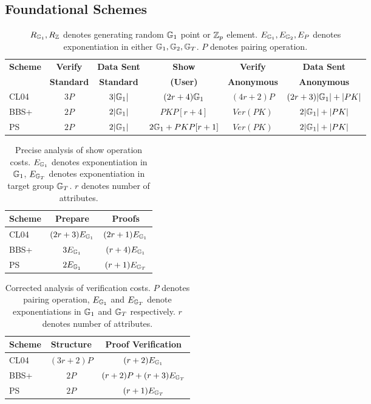 {\subsection{Foundational Schemes}
\begin{table}[ht]
\centering
\label{tab:original-schemes}
\begin{tabular}{l|ccccc}
\toprule
\textbf{Scheme} & \textbf{Verify} & \textbf{Data Sent} & \textbf{Show} & \textbf{Verify} & \textbf{Data Sent} \\
& \textbf{Standard} & \textbf{Standard} & \textbf{(User)} & \textbf{Anonymous} & \textbf{Anonymous} \\
\midrule
CL04 & $3P$ & $3|\mathbb{G}_1|$ & $(2r+4)\mathbb{G}_1$ & $(4r+2)P$ & $(2r+3)|\mathbb{G}_1| + |PK|$ \\
BBS+ & $2P$ & $2|\mathbb{G}_1|$ & $PK{P[r+4]}$ & $Ver(PK)$ & $2|\mathbb{G}_1| + |PK|$ \\
PS & $2P$ & $2|\mathbb{G}_1|$ & $2\mathbb{G}_1 + PK{P[r+1]}$ & $Ver(PK)$ & $2|\mathbb{G}_1| + |PK|$ \\
\bottomrule
\end{tabular}
\caption{$R_{\mathbb{G}_1}, R_{\mathbb{Z}}$ denotes generating random $\mathbb{G}_1$ point or $\mathbb{Z}_p$ element. $E_{\mathbb{G}_1}, E_{\mathbb{G}_2}, E_P$ denotes exponentiation in either $\mathbb{G}_1, \mathbb{G}_2, \mathbb{G}_T$. $P$ denotes pairing operation.}
\end{table}


\begin{table}[ht]
\centering
\label{tab:show-operations-precise}
\begin{tabular}{l|cc}
\toprule
\textbf{Scheme} & \textbf{Prepare} & \textbf{Proofs} \\
\midrule
CL04 & $(2r + 3)E_{\mathbb{G}_1}$ & $(2r + 1)E_{\mathbb{G}_1}$ \\
BBS+ & $3E_{\mathbb{G}_1}$ & $(r + 4)E_{\mathbb{G}_1}$ \\
PS & $2E_{\mathbb{G}_1}$ & $(r + 1)E_{\mathbb{G}_T}$ \\
\bottomrule
\end{tabular}
\caption{Precise analysis of show operation costs. $E_{\mathbb{G}_1}$ denotes exponentiation in $\mathbb{G}_1$, $E_{\mathbb{G}_T}$ denotes exponentiation in target group $\mathbb{G}_T$. $r$ denotes number of attributes.}
\end{table}

\begin{table}[ht]
\centering
\label{tab:verify-operations-corrected}
\begin{tabular}{l|cc}
\toprule
\textbf{Scheme} & \textbf{Structure} & \textbf{Proof Verification} \\
\midrule
CL04 & $(3r + 2)P$ & $(r + 2)E_{\mathbb{G}_1}$ \\
BBS+ & $2P$ & $(r + 2)P + (r + 3)E_{\mathbb{G}_T}$ \\
PS & $2P$ & $(r + 1)E_{\mathbb{G}_T}$ \\
\bottomrule
\end{tabular}
\caption{Corrected analysis of verification costs. $P$ denotes pairing operation, $E_{\mathbb{G}_1}$ and $E_{\mathbb{G}_T}$ denote exponentiations in $\mathbb{G}_1$ and $\mathbb{G}_T$ respectively. $r$ denotes number of attributes.}
\end{table}



}
